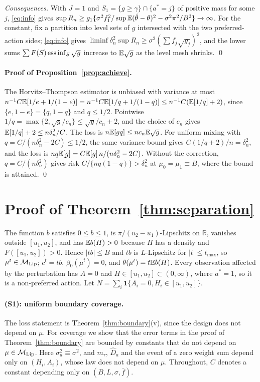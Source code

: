 \emph{Consequences.} With $J=1$ and $S_1=\{g\ge\gamma\}\cap\{a^*=j\}$ of positive
mass for some $j$, \eqref{eq:info} gives
$\sup R_n\ge g_1\{\sigma^2f_1^2/\sup\mathbb{E}(\hat\theta-\theta)^2-\sigma^2\pi^2/B^2\}\to\infty$.
For the constant, fix a partition into level sets of $g$ intersected with the
two preferred-action sides; \eqref{eq:info} gives
$\liminf\delta_n^2\sup R_n\ge\sigma^2(\sum f_j\sqrt{g_j})^2$, and the lower sums
$\sum F(S)\operatorname*{ess\,inf}_S\sqrt g$ increase to $\mathbb{E}\sqrt g$ as the level mesh shrinks. \qed

\paragraph{Proof of Proposition~\ref{prop:achieve}.} The Horvitz--Thompson
estimator is unbiased with variance at most
$n^{-1}C\mathbb{E}[1/e+1/(1-e)]=n^{-1}C\mathbb{E}[1/q+1/(1-q)]\le n^{-1}C(\mathbb{E}[1/q]+2)$,
since $\{e,1-e\}=\{q,1-q\}$ and $q\le1/2$. Pointwise $1/q=\max\{2,\sqrt g/c_n\}\le\sqrt g/c_n+2$,
and the choice of $c_n$ gives $\mathbb{E}[1/q]+2\le n\delta_n^2/C$. The
loss is $n\mathbb{E}[gq]\le nc_n\mathbb{E}\sqrt g$. For uniform mixing with
$q=C/(n\delta_n^2-2C)\le1/2$, the same variance bound
gives $C(1/q+2)/n=\delta_n^2$, and the loss is $nq\mathbb{E}[g]=C\mathbb{E}[g]\,n/(n\delta_n^2-2C)$.
Without the correction, $q=C/(n\delta_n^2)$ gives risk $C/\{nq(1-q)\}>\delta_n^2$
at $\mu_0=\mu_1\equiv B$, where the bound is attained. \qed

\section{Proof of Theorem~\ref{thm:separation}}\label{app:separation}

The function $b$ satisfies $0\le b\le1$, is $\pi/(u_2-u_1)$-Lipschitz on
$\mathbb R$, vanishes outside $[u_1,u_2]$, and has $\mathbb{E} b(H)>0$ because $H$ has a
density and $F([u_1,u_2])>0$. Hence $|tb|\le B$ and $tb$ is $L$-Lipschitz for
$|t|\le t_{\max}$, so $\mu^t\in\mathcal{M}_{\mathrm{Lip}}$; $c^t=tb$, $\beta_0(\mu^t)=0$, and
$\theta(\mu^t)=t\mathbb{E} b(H)$. Every observation affected by the perturbation has
$A=0$ and $H\in[u_1,u_2]\subset(0,\infty)$, where $a^*=1$, so it is a
non-preferred action. Let $N=\sum_i\mathbf 1\{A_i=0,H_i\in[u_1,u_2]\}$.

\paragraph{(S1): uniform boundary coverage.} The loss statement is
Theorem~\ref{thm:boundary}(v), since the design does not depend on $\mu$. For
coverage we show that the error terms in the proof of Theorem~\ref{thm:boundary}
are bounded by constants that do not depend on $\mu\in\mathcal{M}_{\mathrm{Lip}}$. Here
$\sigma_a^2\equiv\sigma^2$, and $m_\tau$, $\hat D_a$ and the event of a zero weight
sum depend only on $(H_i,A_i)$, whose law does not depend on $\mu$. Throughout,
$C$ denotes a constant depending only on $(B,L,\sigma,\bar f)$.

